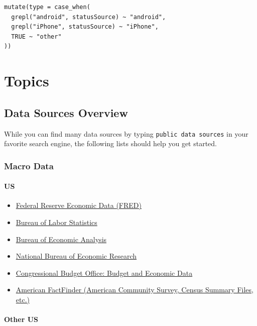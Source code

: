 \documentclass[]{book}
\providecommand{\tightlist}{%
  \setlength{\itemsep}{0pt}\setlength{\parskip}{0pt}}
\theoremstyle{definition}
\theoremstyle{definition}
\theoremstyle{remark}
\begin{document}
\begin{verbatim}
mutate(type = case_when(
  grepl("android", statusSource) ~ "android",
  grepl("iPhone", statusSource) ~ "iPhone",
  TRUE ~ "other"
))
\end{verbatim}

\part{Topics}\label{part-topics}

\hypertarget{data-sources}{\chapter*{Data Sources
Overview}\label{data-sources}}

While you can find many data sources by typing
\texttt{public\ data\ sources} in your favorite search engine, the
following lists should help you get started.

\section*{Macro Data}\label{macro-data}

\subsection*{US}\label{us}

\begin{itemize}
\tightlist
\item
  \href{https://fred.stlouisfed.org/}{Federal Reserve Economic Data
  (FRED)}
\item
  \href{https://www.bls.gov/data/}{Bureau of Labor Statistics}
\item
  \href{https://www.bea.gov/data.htm}{Bureau of Economic Analysis}
\item
  \href{http://www.nber.org/data/}{National Bureau of Economic Research}
\item
  \href{https://www.cbo.gov/about/products/budget-economic-data}{Congressional
  Budget Office: Budget and Economic Data}
\item
  \href{https://factfinder.census.gov/}{American FactFinder (American
  Community Survey, Census Summary Files, etc.)}
\end{itemize}

\subsection*{Other US}\label{other-us}
\end{document}
